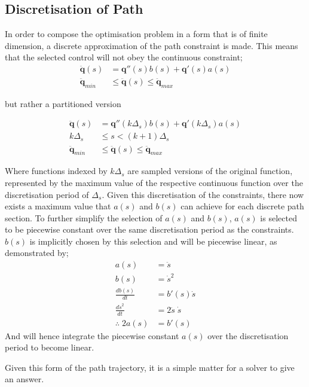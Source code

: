 \subsection{Discretisation of Path}

In order to compose the optimisation problem in a form that is of finite dimension, a discrete approximation of the path constraint is made. This means that the selected control will not obey the continuous constraint;
\begin{align*}
\ddot{\textbf{q}}(s) &= \textbf{q}''(s)b(s) + \textbf{q}'(s)a(s)\\
\ddot{\textbf{q}}_{min} &\leq \ddot{\textbf{q}}(s) \leq \ddot{\textbf{q}}_{max}
\end{align*}

but rather a partitioned version

\begin{align*}
\ddot{\textbf{q}}(s) &= \textbf{q}''(k \Delta_s)b(s) + \textbf{q}'(k\Delta_s)a(s)\\
k\Delta_s &\leq s < (k+1)\Delta_s\\
\ddot{\textbf{q}}_{min} &\leq \ddot{\textbf{q}}(s) \leq \ddot{\textbf{q}}_{max}
\end{align*}

Where functions indexed by $k\Delta_s$ are sampled versions of the original function, represented by the maximum value of the respective continuous function over the discretisation period of $\Delta_s$.
Given this discretisation of the constraints, there now exists a maximum value that $a(s)$ and $b(s)$ can achieve for each discrete path section. To further simplify the selection of $a(s)$ and $b(s)$, $a(s)$ is selected to be piecewise constant over the same discretisation period as the constraints. $b(s)$ is implicitly chosen by this selection and will be piecewise linear, as demonstrated by;
\begin{align*}
a(s) &= \ddot{s}\\
b(s) &= \dot{s}^2\\
\frac{db(s)}{dt} &= b'(s)\dot{s}\\
\frac{d\dot{s}^2}{dt} &= 2\ddot{s}\;\dot{s}\\
\therefore \; 2a(s) &= b'(s)  
\end{align*}
And will hence integrate the piecewise constant $a(s)$ over the discretisation period to become linear.
 
Given this form of the path trajectory, it is a simple matter for a solver to give an answer.

